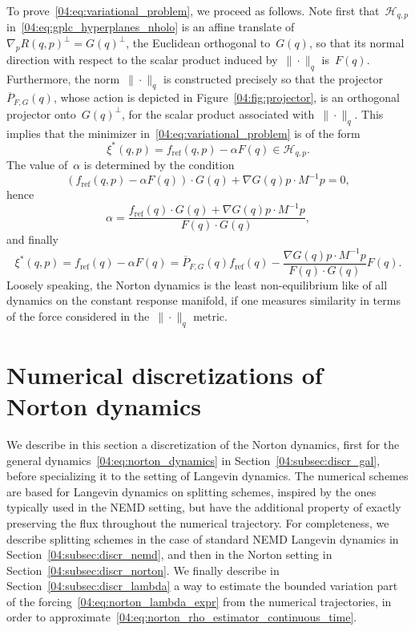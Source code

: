 To prove~\eqref{04:eq:variational_problem}, we proceed as follows. Note first that~$\mathcal{H}_{q,p}$ in~\eqref{04:eq:gplc_hyperplanes_nholo} is an affine translate of~$ \nabla_p R(q,p)^\perp = G(q)^\perp$, the Euclidean orthogonal to~$G(q)$, so that its normal direction with respect to the scalar product induced by~$\|\cdot\|_q$ is~$F(q)$.
Furthermore, the norm~$\|\cdot \|_q$ is constructed precisely so that the projector~$\overline{P}_{F,G}(q)$, whose action is depicted in Figure~\ref{04:fig:projector}, is an orthogonal projector onto~$G(q)^\perp$, for the scalar product associated with~$\|\cdot \|_q$. This implies that the minimizer in~\eqref{04:eq:variational_problem} is of the form
\[\xi^*(q,p) = f_{\mathrm{ref}}(q,p) -\alpha F(q) \in \mathcal{H}_{q,p}.\]
The value of~$\alpha$ is determined by the condition
\[\left(f_{\mathrm{ref}}(q,p) -\alpha F(q)\right)\cdot G(q) + \nabla G(q)p\cdot M^{-1}p =0,\]
hence 
\[\alpha = \frac{f_{\mathrm{ref}}(q)\cdot G(q) +\nabla G(q)p\cdot M^{-1}p}{F(q)\cdot G(q)},\]
and finally
\[\xi^*(q,p)=f_{\mathrm{ref}}(q)-\alpha F(q)=\overline P_{F,G}(q)f_{\mathrm{ref}}(q)-\frac{\nabla G(q)p\cdot M^{-1}p}{F(q)\cdot G(q)}F(q).\]
Loosely speaking, the Norton dynamics is the least non-equilibrium like of all dynamics on the constant response manifold, if one measures similarity in terms of the force considered in the~$\|\cdot\|_q$ metric.

\section{Numerical discretizations of Norton dynamics}\label{04:sec:discr}
We describe in this section a discretization of the Norton dynamics, first for the general dynamics~\eqref{04:eq:norton_dynamics} in Section~\ref{04:subsec:discr_gal}, before specializing it to the setting of Langevin dynamics. The numerical schemes are based for Langevin dynamics on splitting schemes, inspired by the ones typically used in the NEMD setting, but have the additional property of exactly preserving the flux throughout the numerical trajectory. For completeness, we describe splitting schemes in the case of standard NEMD Langevin dynamics in Section~\ref{04:subsec:discr_nemd}, and then in the Norton setting in Section~\ref{04:subsec:discr_norton}. We finally describe in Section~\ref{04:subsec:discr_lambda} a way to estimate the bounded variation part of the forcing~\eqref{04:eq:norton_lambda_expr} from the numerical trajectories, in order to approximate~\eqref{04:eq:norton_rho_estimator_continuous_time}.

